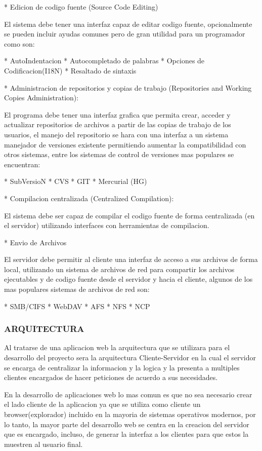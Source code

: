 * Edicion de codigo fuente (Source Code Editing)

El sistema debe tener una interfaz capaz de editar codigo fuente, opcionalmente se pueden incluir ayudas comunes pero de gran utilidad para un programador como son:

* AutoIndentacion
* Autocompletado de palabras
* Opciones de Codificacion(I18N)
* Resaltado de sintaxis

* Administracion de repositorios y copias de trabajo (Repositories and Working Copies Administration):

El programa debe tener una interfaz grafica que permita crear, acceder y actualizar repositorios de archivos a partir de las copias de trabajo de los usuarios, el manejo del repositorio se hara con una interfaz a un sistema manejador de versiones existente permitiendo aumentar la compatibilidad con otros sistemas, entre los sistemas de control de versiones mas populares se encuentran:

* SubVersioN
* CVS
* GIT
* Mercurial (HG)


* Compilacion centralizada (Centralized Compilation):

El sistema debe ser capaz de compilar el codigo fuente de forma centralizada (en el servidor) utilizando interfaces con herramientas de compilacion.

* Envio de Archivos

El servidor debe permitir al cliente una interfaz de acceso a sus archivos de forma local, utilizando un sistema de archivos de red para compartir los archivos ejecutables y de codigo fuente desde el servidor y hacia el cliente, algunos de los mas populares sistemas de archivos de red son:

* SMB/CIFS
* WebDAV
* AFS
* NFS
* NCP





\subsubsection{ARQUITECTURA}

Al tratarse de una aplicacion web la arquitectura que se utilizara para el desarrollo del proyecto sera la arquitectura Cliente-Servidor en la cual el servidor se encarga de centralizar la informacion y la logica y la presenta a multiples clientes encargados de hacer peticiones de acuerdo a sus necesidades.

En la desarrollo de aplicaciones web lo mas comun es que no sea necesario crear el lado cliente de la aplicacion ya que se utiliza como cliente un browser(explorador) incluido en la mayoria de sistemas operativos modernos, por lo tanto, la mayor parte del desarrollo web se centra en la creacion del servidor que es encargado, incluso, de generar la interfaz a los clientes para que estos la muestren al usuario final.


